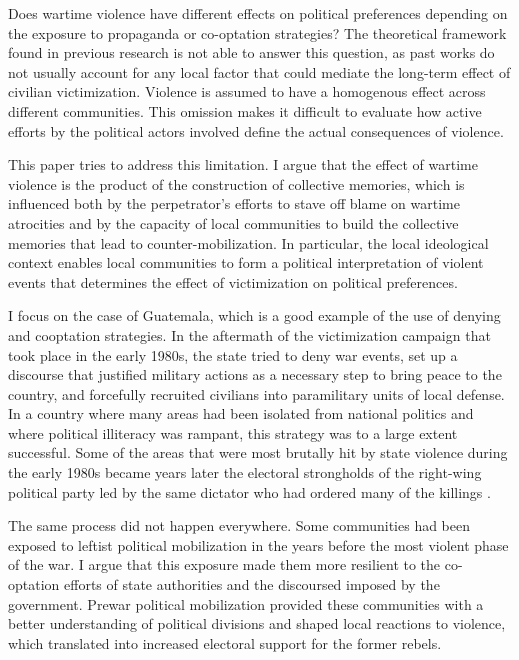 \documentclass[12pt, notitlepage]{article}
\begin{document}
Does wartime violence have different effects on political preferences depending on the exposure to propaganda or co-optation strategies?
The theoretical framework found in previous research is not able to answer this question, as past works do not usually account for any local factor that could mediate the long-term effect of civilian victimization.
Violence is assumed to have a homogenous effect across different communities.
This omission makes it difficult to evaluate how active efforts by the political actors involved define the actual consequences of violence.

This paper tries to address this limitation.
I argue that the effect of wartime violence is the product of the construction of collective memories, which is influenced both by the perpetrator's efforts to stave off blame on wartime atrocities and by the capacity of local communities to build the collective memories that lead to counter-mobilization.
In particular, the local ideological context enables local communities to form a political interpretation of violent events that determines the effect of victimization on political preferences.

I focus on the case of Guatemala, which is a good example of the use of denying and cooptation strategies.
In the aftermath of the victimization campaign that took place in the early 1980s, the state tried to deny war events, set up a discourse that justified military actions as a necessary step to bring peace to the country, and forcefully recruited civilians into paramilitary units of local defense.
In a country where many areas had been isolated from national politics and where political illiteracy was rampant, this strategy was to a large extent successful.
Some of the areas that were most brutally hit by state violence during the early 1980s became years later the electoral strongholds of the right-wing political party led by the same dictator who had ordered many of the killings \citep{Ball:1999ab}.

The same process did not happen everywhere.
Some communities had been exposed to leftist political mobilization in the years before the most violent phase of the war.
I argue that this exposure made them more resilient to the co-optation efforts of state authorities and the discoursed imposed by the government.
Prewar political mobilization provided these communities with a better understanding of political divisions and shaped local reactions to violence, which translated into increased electoral support for the former rebels.
\end{document}
